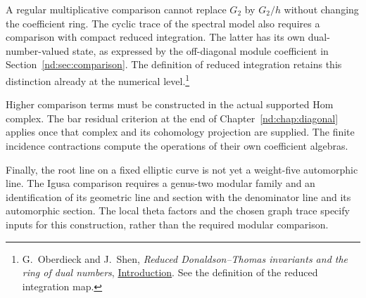 A regular multiplicative comparison cannot replace $G_2$ by $G_2/h$
without changing the coefficient ring.
The cyclic trace of the spectral model also requires a comparison
with compact reduced integration.
The latter has its own dual-number-valued state, as expressed by the
off-diagonal module coefficient in Section~\ref{nd:sec:comparison}.
The definition of reduced integration retains this distinction
already at the numerical level.\footnote{G.~Oberdieck and J.~Shen,
\emph{Reduced Donaldson--Thomas invariants and the ring of dual numbers},
\href{https://arxiv.org/abs/1612.03102}{Introduction}.
See the definition of the reduced integration map.}

Higher comparison terms must be constructed in the actual supported
Hom complex. The bar residual criterion at the end of
Chapter~\ref{nd:chap:diagonal} applies once that complex and its
cohomology projection are supplied.
The finite incidence contractions compute the operations of their
own coefficient algebras.

Finally, the root line on a fixed elliptic curve is not yet a
weight-five automorphic line. The Igusa comparison requires a
genus-two modular family and an identification of its geometric line
and section with the denominator line and its automorphic section.
The local theta factors and the chosen graph trace specify inputs
for this construction, rather than the required modular comparison.
